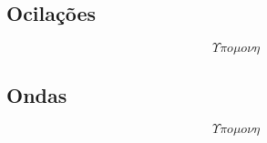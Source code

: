 \subsection{Ocilações}
    \[ \Upsilon \pi o \mu o \nu \eta \]
\subsection{Ondas}
    \[ \Upsilon \pi o \mu o \nu \eta \]